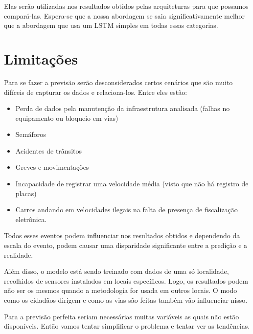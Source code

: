 Elas serão utilizadas nos resultados obtidos pelas arquiteturas para que possamos compará-las. Espera-se que a nossa abordagem se saia significativamente melhor que a abordagem que usa um \acrshort{LSTM} simples em todas essas categorias.
    
\section{Limitações}
Para se fazer a previsão serão desconsiderados certos cenários que são muito difíceis de capturar os dados e relaciona-los. Entre eles estão:
\begin{itemize}
    \item Perda de dados pela manutenção da infraestrutura analisada (falhas no equipamento ou bloqueio em vias)
    \item Semáforos
    \item Acidentes de trânsitos
    \item Greves e movimentações
    \item Incapacidade de registrar uma velocidade média (visto que não há registro de placas)
    \item Carros andando em velocidades ilegais na falta de presença de fiscalização eletrônica.
\end{itemize}
Todos esses eventos podem influenciar nos resultados obtidos e dependendo da escala do evento, podem causar uma disparidade significante entre a predição e a realidade.

Além disso, o modelo está sendo treinado com dados de uma só localidade, recolhidos de sensores instalados em locais específicos. Logo, os resultados podem não ser os mesmos quando a metodologia for usada em outros locais. O modo como os cidadãos dirigem e como as vias são feitas também vão influenciar nisso.

Para a previsão perfeita seriam necessárias muitas variáveis as quais não estão disponíveis. Então vamos tentar simplificar o problema e tentar ver as tendências.